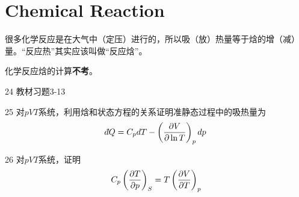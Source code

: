 \documentclass[CJK]{beamer}
\begin{document}
\section{Chemical Reaction}

\begin{frame}
\bch
很多化学反应是在大气中（定压）进行的，所以吸（放）热量等于焓的增（减）量。“反应热”其实应该叫做“反应焓”。

\skiplines

化学反应焓的计算{\bf \Huge 不考}。
\ech
\end{frame}


\begin{frame}
\bch
\bitem
\item[24]{ 教材习题3-13}
\item[25]{ 对$pVT$系统，利用焓和状态方程的关系证明准静态过程中的吸热量为
$$ \dbar Q = C_p dT - \pfrac V{\ln T}p dp$$}
\item[26]{ 对$pVT$系统，证明
$$C_p \left(\frac{\partial T}{\partial p}\right)_{S} = T \left(\frac{\partial V}{\partial T}\right)_{p} $$ }
\eitem
\ech
\end{frame}
\end{document}
